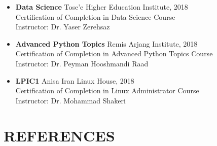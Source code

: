\documentclass[11pt]{article}
\begin{document}
\begin{itemize}[noitemsep,topsep=0pt,parsep=0pt,partopsep=0pt]
	\item {\textbf{Data Science} \hfill Tose’e Higher Education Institute, 2018}\vspace{1mm}\\
	Certification of Completion in Data Science Course\\
	Instructor: Dr. Yaser Zerehsaz\vspace{1mm}
	
	\item {\textbf{Advanced Python Topics} \hfill Remis Arjang Institute, 2018}\vspace{1mm}\\
	Certification of Completion in Advanced Python Topics Course\\
	Instructor: Dr. Peyman Hooshmandi Raad\vspace{1mm}
	
	\item {\textbf{LPIC1} \hfill Anisa Iran Linux House, 2018}\vspace{1mm}\\
	Certification of Completion in Linux Administrator Course\\
	Instructor: Dr. Mohammad Shakeri\vspace{1mm}


\end{itemize}



\section{REFERENCES}
\end{document}
